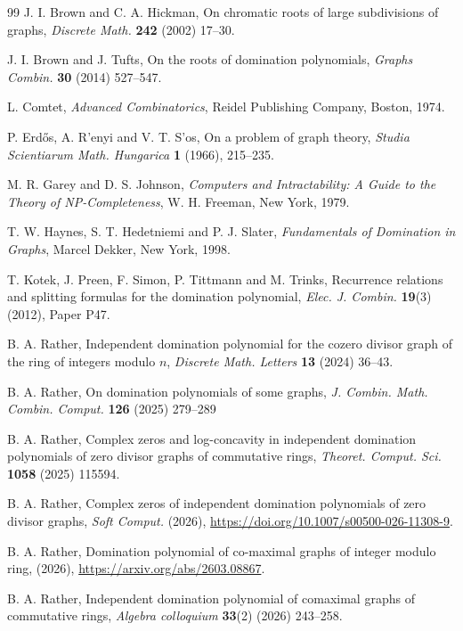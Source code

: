 \documentclass[12pt]{article}
\theoremstyle{definition}
\begin{document}
\begin{thebibliography}{99}
		J. I. Brown and C. A. Hickman,
		On chromatic roots of large subdivisions of graphs,
		\emph{Discrete Math.} \textbf{242} (2002) 17--30.
		
		J. I. Brown and J. Tufts,
		On the roots of domination polynomials,
		\emph{Graphs  Combin.} \textbf{30} (2014) 527--547.
		
		L. Comtet,
		\emph{Advanced Combinatorics},
		Reidel Publishing Company, Boston, 1974.
		
		P. Erd\H{o}s, A. R'enyi and V. T. S'os,
		On a problem of graph theory,
		\emph{Studia Scientiarum Math. Hungarica} \textbf{1} (1966), 215--235.
		
		M. R. Garey and D. S. Johnson,
		\emph{Computers and Intractability: A Guide to the Theory of NP-Completeness},
		W. H. Freeman, New York, 1979.
		
		T. W. Haynes, S. T. Hedetniemi and P. J. Slater,
		\emph{Fundamentals of Domination in Graphs},
		Marcel Dekker, New York, 1998.
		
		T. Kotek, J. Preen, F. Simon, P. Tittmann and M. Trinks,
		Recurrence relations and splitting formulas for the domination polynomial,
		\emph{Elec. J. Combin.} \textbf{19}(3) (2012), Paper P47.
		
		 B. A. Rather, Independent domination polynomial for the cozero divisor graph of the ring of integers modulo $n$,  {\emph{Discrete Math. Letters}}  \textbf{13} (2024) 36--43.
		
		 B. A. Rather, On domination polynomials of some graphs, \textit{J. Combin. Math. Combin. Comput.} \textbf{126} (2025) 279--289

		
		 B. A. Rather, Complex zeros and log-concavity in independent domination polynomials of zero divisor graphs of commutative rings,  \emph{Theoret. Comput. Sci.} \textbf{1058} (2025) 115594.
		
		  B. A. Rather, Complex zeros of independent domination polynomials of zero divisor graphs, \emph{Soft Comput.} (2026), \url{https://doi.org/10.1007/s00500-026-11308-9}.
		
		 B. A. Rather, Domination polynomial of co-maximal graphs of integer modulo ring, (2026), \url{https://arxiv.org/abs/2603.08867}.
		
		 B. A. Rather, Independent domination polynomial of comaximal graphs of commutative rings, \emph{Algebra colloquium} \textbf{33}(2) (2026) 243--258.
		
	\end{thebibliography}
	
\end{document}
